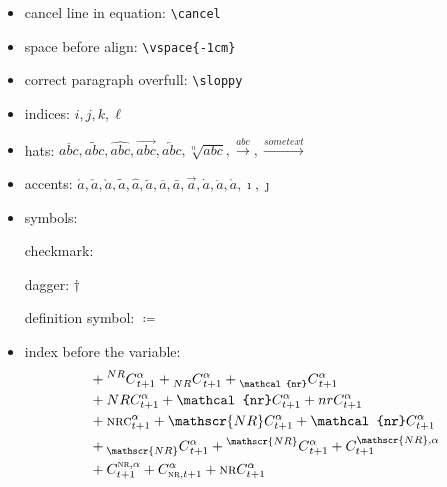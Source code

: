 \documentclass[
	12pt,
	]{article}
\numberwithin{equation}{section}
\newcommand{\com}[1]{\texttt{\textbackslash #1}}
\theoremstyle{definition}
\theoremstyle{plain}
\theoremstyle{plain}
\theoremstyle{plain}
\begin{document}
\begin{itemize}
	
	\item cancel line in equation: \com{cancel}
	
	
	\item space before align: \com{vspace\{-1cm\}} %
	
	\item correct paragraph overfull: \com{sloppy}
		
	\item indices: $i,j,k,\ell$
	
	\item hats: \( \overline{abc}, \widetilde{abc}, \widehat{abc}, \overrightarrow{abc}, \overleftarrow{abc}, \sqrt[n]{abc}, \xrightarrow{abc}, \xrightarrow{some text}\)
	
	\item accents: \(\acute{a}, \check{a}, \grave{a}, \widetilde{a}, \hat{a}, \breve{a}, \overline{a}, \bar{a}, \vec{a}, \dot{a}, \ddot{a}, \mathring{a}, \imath, \jmath\)
		
	\item symbols:
	
	checkmark: \checkmark 
	
	dagger: $\dagger$
	
	definition symbol: $\coloneq$
	
	\item index before the variable:
	\begin{align*}
		& + \prescript{NR}{}{C}^{\alpha}_{t+1} + \prescript{}{NR}{C}^{\alpha}_{t+1} + \prescript{}{\mathcal{nr}}{C}^{\alpha}_{t+1}        
		\\
		& + NRC^{\alpha}_{t+1} + \mathcal{nr}C^{\alpha}_{t+1} + nrC^{\alpha}_{t+1}
		\\
		& + \textsc{nrc}^{\alpha}_{t+1} + \mathscr{NR}C^{\alpha}_{t+1} + \mathcal{nr}C^{\alpha}_{t+1}
		\\
		& + \prescript{}{\mathscr{NR}}{C}^{\alpha}_{t+1} + \prescript{\mathscr{NR}}{}{C}^{\alpha}_{t+1} + {C}^{\mathscr{NR},\alpha}_{t+1} 
		\\
		& + {C}^{\textsc{nr},\alpha}_{t+1} + {C}^{\alpha}_{\textsc{nr},t+1} + \textsc{nr}C^{\alpha}_{t+1}
	\end{align*}
	

\end{itemize}
\end{document}

